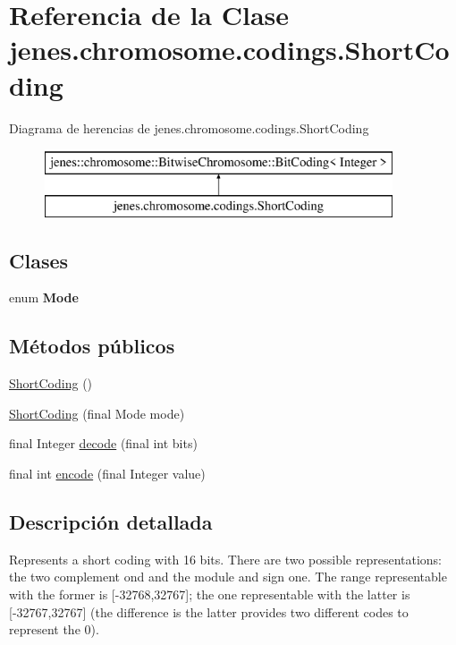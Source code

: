 \hypertarget{classjenes_1_1chromosome_1_1codings_1_1_short_coding}{\section{Referencia de la Clase jenes.\-chromosome.\-codings.\-Short\-Coding}
\label{classjenes_1_1chromosome_1_1codings_1_1_short_coding}
}
Diagrama de herencias de jenes.\-chromosome.\-codings.\-Short\-Coding\begin{figure}[H]
\begin{center}
\leavevmode
\includegraphics[height=2.000000cm]{classjenes_1_1chromosome_1_1codings_1_1_short_coding}
\end{center}
\end{figure}
\subsection*{Clases}
\begin{DoxyCompactItemize}
\item 
enum {\bfseries Mode}
\end{DoxyCompactItemize}
\subsection*{Métodos públicos}
\begin{DoxyCompactItemize}
\item 
\hyperlink{classjenes_1_1chromosome_1_1codings_1_1_short_coding_a0571cd23357dd77c1525ed09a5c28e61}{Short\-Coding} ()
\item 
\hyperlink{classjenes_1_1chromosome_1_1codings_1_1_short_coding_a6b6608f22e850e062f424033fae5e0bd}{Short\-Coding} (final Mode mode)
\item 
final Integer \hyperlink{classjenes_1_1chromosome_1_1codings_1_1_short_coding_aa6c8649fe7e82bf923979d4afdfc9130}{decode} (final int bits)
\item 
final int \hyperlink{classjenes_1_1chromosome_1_1codings_1_1_short_coding_a140298d12b6d6a291b5849b9cc5b7400}{encode} (final Integer value)
\end{DoxyCompactItemize}


\subsection{Descripción detallada}
Represents a short coding with 16 bits. There are two possible representations\-: the two complement ond and the module and sign one. The range representable with the former is \mbox{[}-\/32768,32767\mbox{]}; the one representable with the latter is \mbox{[}-\/32767,32767\mbox{]} (the difference is the latter provides two different codes to represent the 0).

